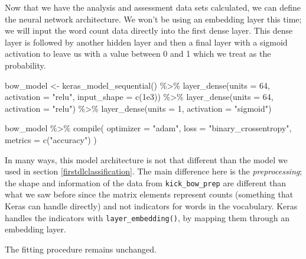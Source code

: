 \documentclass[
]{krantz}
\makeatletter
\newenvironment{Shaded}{\begin{snugshade}}{\end{snugshade}}
\newcommand{\AttributeTok}[1]{\textcolor[rgb]{0.77,0.63,0.00}{#1}}
\newcommand{\DecValTok}[1]{\textcolor[rgb]{0.00,0.00,0.81}{#1}}
\newcommand{\FloatTok}[1]{\textcolor[rgb]{0.00,0.00,0.81}{#1}}
\newcommand{\FunctionTok}[1]{\textcolor[rgb]{0.00,0.00,0.00}{#1}}
\newcommand{\NormalTok}[1]{#1}
\newcommand{\OtherTok}[1]{\textcolor[rgb]{0.56,0.35,0.01}{#1}}
\newcommand{\SpecialCharTok}[1]{\textcolor[rgb]{0.00,0.00,0.00}{#1}}
\newcommand{\StringTok}[1]{\textcolor[rgb]{0.31,0.60,0.02}{#1}}
\newenvironment{kframe}{%
\medskip{}
\setlength{\fboxsep}{.8em}
 \def\at@end@of@kframe{}%
 \ifinner\ifhmode%
  \def\at@end@of@kframe{\end{minipage}}%
  \begin{minipage}{\columnwidth}%
 \fi\fi%
 \def\FrameCommand##1{\hskip\@totalleftmargin \hskip-\fboxsep
 \colorbox{shadecolor}{##1}\hskip-\fboxsep
     \hskip-\linewidth \hskip-\@totalleftmargin \hskip\columnwidth}%
 \MakeFramed {\advance\hsize-\width
   \@totalleftmargin\z@ \linewidth\hsize
   \@setminipage}}%
 {\par\unskip\endMakeFramed%
 \at@end@of@kframe}
\renewenvironment{Shaded}{\begin{kframe}}{\end{kframe}}
\makeatother
\begin{document}
Now that we have the analysis and assessment data sets calculated, we can define the neural network architecture. We won't be using an embedding layer this time; we will input the word count data directly into the first dense layer. This dense layer is followed by another hidden layer and then a final layer with a sigmoid activation to leave us with a value between 0 and 1 which we treat as the probability.

\begin{Shaded}
\begin{Highlighting}[]
\NormalTok{bow\_model }\OtherTok{\textless{}{-}} \FunctionTok{keras\_model\_sequential}\NormalTok{() }\SpecialCharTok{\%\textgreater{}\%}
  \FunctionTok{layer\_dense}\NormalTok{(}\AttributeTok{units =} \DecValTok{64}\NormalTok{, }\AttributeTok{activation =} \StringTok{"relu"}\NormalTok{, }\AttributeTok{input\_shape =} \FunctionTok{c}\NormalTok{(}\FloatTok{1e3}\NormalTok{)) }\SpecialCharTok{\%\textgreater{}\%}
  \FunctionTok{layer\_dense}\NormalTok{(}\AttributeTok{units =} \DecValTok{64}\NormalTok{, }\AttributeTok{activation =} \StringTok{"relu"}\NormalTok{) }\SpecialCharTok{\%\textgreater{}\%}
  \FunctionTok{layer\_dense}\NormalTok{(}\AttributeTok{units =} \DecValTok{1}\NormalTok{, }\AttributeTok{activation =} \StringTok{"sigmoid"}\NormalTok{)}

\NormalTok{bow\_model }\SpecialCharTok{\%\textgreater{}\%} \FunctionTok{compile}\NormalTok{(}
  \AttributeTok{optimizer =} \StringTok{"adam"}\NormalTok{,}
  \AttributeTok{loss =} \StringTok{"binary\_crossentropy"}\NormalTok{,}
  \AttributeTok{metrics =} \FunctionTok{c}\NormalTok{(}\StringTok{"accuracy"}\NormalTok{)}
\NormalTok{)}
\end{Highlighting}
\end{Shaded}

In many ways, this model architecture is not that different than the model we used in section \ref{firstdlclassification}. The main difference here is the \emph{preprocessing}; the shape and information of the data from \texttt{kick\_bow\_prep} are different than what we saw before since the matrix elements represent counts (something that Keras can handle directly) and not indicators for words in the vocabulary. Keras handles the indicators with \texttt{layer\_embedding()}, by mapping them through an embedding layer.

The fitting procedure remains unchanged.
\end{document}
